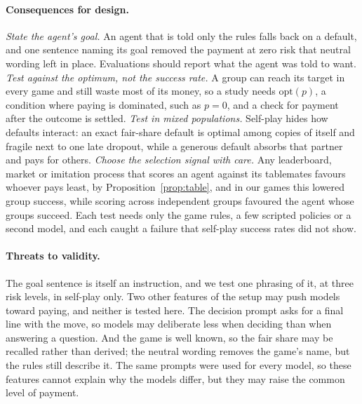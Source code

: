 \paragraph{Consequences for design.}
\emph{State the agent's goal.} An agent that is told only the rules falls back on a default,
and one sentence naming its goal removed the payment at zero risk that neutral wording left in
place. Evaluations should report what the agent was told to want.
\emph{Test against the optimum, not the success rate.} A group can reach its target in every
game and still waste most of its money, so a study needs $\mathrm{opt}(p)$, a condition where
paying is dominated, such as $p=0$, and a check for payment after the outcome is settled.
\emph{Test in mixed populations.} Self-play hides how defaults interact: an exact fair-share
default is optimal among copies of itself and fragile next to one late dropout, while a
generous default absorbs that partner and pays for others. \emph{Choose the selection signal
with care.} Any leaderboard, market or imitation process that scores an agent against its
tablemates favours whoever pays least, by Proposition~\ref{prop:table}, and in our games this
lowered group success, while scoring across independent groups favoured the agent whose
groups succeed. Each test needs only the game rules, a few scripted policies or a second
model, and each caught a failure that self-play success rates did not show.

\paragraph{Threats to validity.}
The goal sentence is itself an instruction, and we test one phrasing of it, at three risk
levels, in self-play only. Two other features of the setup may push models toward paying, and
neither is tested here. The decision prompt asks for a final line with the move, so models
may deliberate less when deciding than when answering a question. And the game is well
known, so the fair share may be recalled rather than derived; the neutral wording removes the
game's name, but the rules still describe it. The same prompts were used for every model, so
these features cannot explain why the models differ, but they may raise the common level of
payment.

